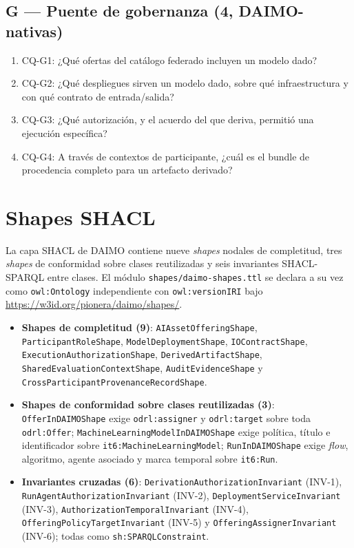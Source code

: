 \documentclass[11pt,a4paper]{article}
\newcommand{\code}[1]{\texttt{#1}}
\newcommand{\cq}[1]{\textsf{#1}}
\begin{document}
\subsection*{G --- Puente de gobernanza (4, DAIMO-nativas)}
\begin{enumerate}[label=\arabic*., leftmargin=*]
\item \cq{CQ-G1}: ¿Qué ofertas del catálogo federado incluyen un modelo dado?
\item \cq{CQ-G2}: ¿Qué despliegues sirven un modelo dado, sobre qué infraestructura y con qué contrato de entrada/salida?
\item \cq{CQ-G3}: ¿Qué autorización, y el acuerdo del que deriva, permitió una ejecución específica?
\item \cq{CQ-G4}: A través de contextos de participante, ¿cuál es el bundle de procedencia completo para un artefacto derivado?
\end{enumerate}

\section{Shapes SHACL}\label{app:shapes}

La capa SHACL de DAIMO contiene nueve \emph{shapes} nodales de completitud, tres \emph{shapes} de conformidad sobre clases reutilizadas y seis invariantes SHACL-SPARQL entre clases. El módulo \code{shapes/daimo-shapes.ttl} se declara a su vez como \code{owl:Ontology} independiente con \code{owl:versionIRI} bajo \url{https://w3id.org/pionera/daimo/shapes/}.

\begin{itemize}[leftmargin=*]
\item \textbf{Shapes de completitud (9)}: \code{AIAssetOfferingShape}, \code{ParticipantRoleShape}, \code{ModelDeploymentShape}, \code{IOContractShape}, \code{ExecutionAuthorizationShape}, \code{DerivedArtifactShape}, \code{SharedEvaluationContextShape}, \code{AuditEvidenceShape} y \code{CrossParticipantProvenanceRecordShape}.
\item \textbf{Shapes de conformidad sobre clases reutilizadas (3)}: \code{OfferInDAIMOShape} exige \code{odrl:assigner} y \code{odrl:target} sobre toda \code{odrl:Offer}; \code{MachineLearningModelInDAIMOShape} exige política, título e identificador sobre \code{it6:MachineLearningModel}; \code{RunInDAIMOShape} exige \emph{flow}, algoritmo, agente asociado y marca temporal sobre \code{it6:Run}.
\item \textbf{Invariantes cruzadas (6)}: \code{DerivationAuthorizationInvariant} (INV-1), \code{RunAgentAuthorizationInvariant} (INV-2), \code{DeploymentServiceInvariant} (INV-3), \code{AuthorizationTemporalInvariant} (INV-4), \code{OfferingPolicyTargetInvariant} (INV-5) y \code{OfferingAssignerInvariant} (INV-6); todas como \code{sh:SPARQLConstraint}.
\end{itemize}
\end{document}
